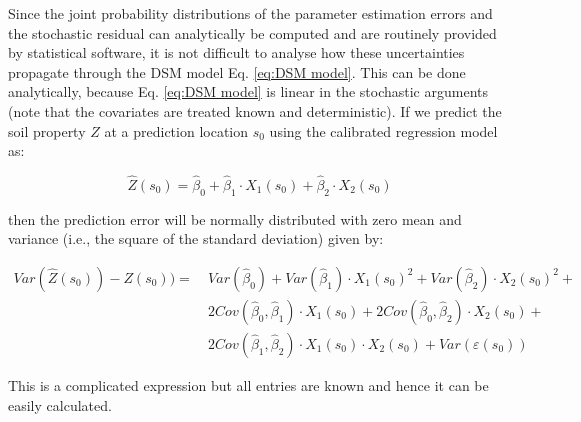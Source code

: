 \documentclass[10pt,b5paper,]{book}
\theoremstyle{definition}
\theoremstyle{definition}
\theoremstyle{definition}
\theoremstyle{remark}
\begin{document}
Since the joint probability distributions of the parameter estimation
errors and the stochastic residual can analytically be computed and are
routinely provided by statistical software, it is not difficult to
analyse how these uncertainties propagate through the DSM model Eq.
\ref{eq:DSM model}. This can be done analytically, because Eq.
\ref{eq:DSM model} is linear in the stochastic arguments (note that the
covariates are treated known and deterministic). If we predict the soil
property \(Z\) at a prediction location \({s_0}\) using the calibrated
regression model as:

\begin{equation}
\label{eq:cal regmodel}
\hat{Z}(s_0) = \hat{\beta}_0 + \hat{\beta}_1  \cdot X_1 (s_0) +  \hat{\beta}_2 \cdot X_2 (s_0)
\end{equation}

then the prediction error will be normally distributed with zero mean
and variance (i.e., the square of the standard deviation) given by:

\begin{equation}
\begin{aligned}
\label{eq:pred err}
Var(\hat{Z}(s_0)) - Z(s_0)) = & \ Var(\hat{\beta}_0) + Var(\hat{\beta}_1)  \cdot X_1 (s_0)^2 +  Var(\hat{\beta}_2) \cdot X_2 (s_0)^2 + \\
                      & \ 2 Cov(\hat{\beta}_0,\hat{\beta}_1) \cdot  X_1 (s_0) + 2 Cov(\hat{\beta}_0,\hat{\beta}_2) \cdot X_2 (s_0) + \\
                      & \ 2 Cov(\hat{\beta}_1,\hat{\beta}_2) \cdot  X_1 (s_0) \cdot  X_2 (s_0) + Var(\varepsilon(s_0))
\end{aligned}
\end{equation}

This is a complicated expression but all entries are known and hence it
can be easily calculated.
\end{document}
